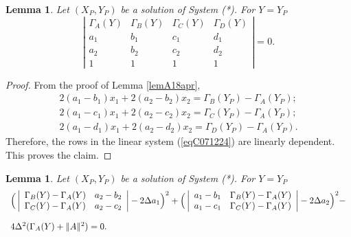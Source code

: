 \documentclass[10pt]{amsart}
\newtheorem{lem}[thm]{Lemma}
\theoremstyle{definition}
\theoremstyle{remark}
\begin{document}
\begin{lem} Let $(X_P,Y_P)$ be a solution of System (*). For $Y=Y_P$
\label{lemB071224}
\begin{equation}
\label{eqE071224}
\left| \begin{array}{cccccc}
  \Gamma_A(Y) & \Gamma_B(Y)& \Gamma_C(Y) & \Gamma_D(Y) \\
  a_1 & b_1 & c_1 & d_1  \\
  a_2 & b_2 & c_2 & d_2  \\
  1 & 1 & 1 & 1
\end{array}\right|=0.
\end{equation}
\end{lem}
\begin{proof}
From the proof of Lemma \ref{lemA18apr},
\begin{equation}
\label{eqC071224}
  \begin{array}{llll}
    2(a_1-b_1)x_1+ 2(a_2-b_2)x_2 = \Gamma_B(Y_P)-\Gamma_A(Y_P);\\
    2(a_1-c_1)x_1+ 2(a_2-c_2)x_2 =\Gamma_C(Y_P)-\Gamma_A(Y_P);\\
    2(a_1-d_1)x_1+ 2(a_2-d_2)x_2 =\Gamma_D(Y_P)-\Gamma_A(Y_P).
  \end{array}
\end{equation}
Therefore, the rows in the linear system (\ref{eqC071224}) are linearly dependent. This proves the claim.
\end{proof}
\begin{lem}Let $(X_P,Y_P)$ be a solution of System (*). For $Y=Y_P$
\label{lemC071224}\begin{equation}
\label{eqG071224}
\begin{array}{llll}
\vspace{0.2cm}
\Big(\left|\begin{array}{lllll}
\Gamma_B(Y)-\Gamma_A(Y)  & a_2-b_2 \\
\Gamma_C(Y)-\Gamma_A(Y) & a_2-c_2  \\
  \end{array}\right|
  -2\Delta a_1\Big)^2+
  \vspace{0.2cm}
\Big(\left|
\begin{array}{lllll}
a_1-b_1 &\Gamma_B(Y)-\Gamma_A(Y)\\
a_1-c_1 & \Gamma_C(Y)-\Gamma_A(Y) \\
\end{array}\right|
  -2\Delta a_2\Big)^2-\\
\vspace{0.2cm}
  4\Delta^2(\Gamma_A(Y)+\|A\|^2)=0.
\end{array}
\end{equation}
\end{lem}
\end{document}
